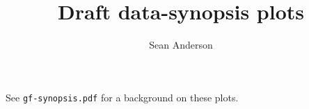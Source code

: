 \documentclass[12pt]{article}
\title{Draft data-synopsis plots}
\author{Sean Anderson}
\begin{document}
\maketitle


See \texttt{gf-synopsis.pdf} for a background on these plots.

\tableofcontents

\restoregeometry
\textheight 26cm

\clearpage




\end{document}
